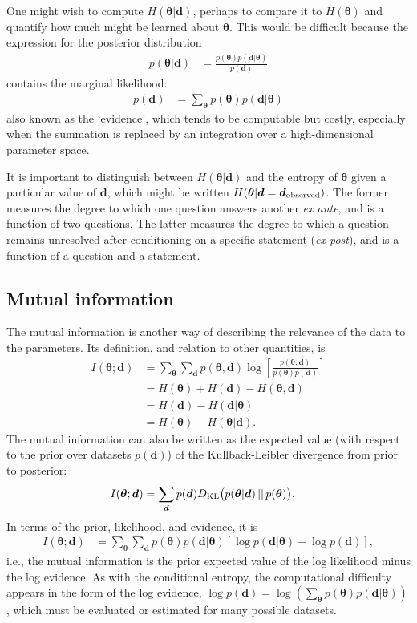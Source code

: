 \documentclass[entropy,article,accept,oneauthor,pdftex,10pt,a4paper]{mdpi}
\newcommand{\revision}{\color{darkblue}}
\renewcommand{\d}{\boldsymbol{d}}
\newcommand{\x}{\boldsymbol{\theta}}
\begin{document}
One might wish to compute $H(\x | \d)$, perhaps to compare it to
$H(\x)$ and quantify how much might be learned about $\x$.
This would be difficult because the expression
for the posterior distribution
\begin{align}
p(\x | \d) &= \frac{p(\x)p(\d | \x)}{p(\d)}
\end{align}
contains the marginal likelihood:
\begin{align}
p(\d) &= \sum_{\x} p(\x) p(\d | \x)
\end{align}
also known as the `evidence', which tends to be computable but costly,
especially when the summation is replaced by an integration over a
high-dimensional parameter space.

It is important to distinguish between $H(\x | \d)$ and the
entropy of $\x$ given a particular value of $\d$, which might be written
$H(\x | \d=\d_{\rm observed})$.
The former measures the degree to which one question answers
another {\em ex ante}, and is a function of two questions.
The latter measures the degree to which {\revision a question remains unresolved
after conditioning on a specific statement ({\em ex post})},
and is a function of a question and a statement.

\subsection{Mutual information}

The mutual information is another way of describing the relevance of the
data to the parameters. Its definition, and relation to other quantities, is
\begin{align}
I(\x; \d) &= \sum_{\x} \sum_{\d} p(\x, \d)
                       \log\left[\frac{p(\x, \d)}{p(\x)p(\d)}\right]\\
           &= H(\x) + H(\d) - H(\x, \d)\\
           &= H(\d) - H(\d | \x)\\
           &= H(\x) - H(\x | \d).
\end{align}
The mutual information can also be written as the expected value
(with respect to the prior over datasets $p(\d)$) of the Kullback-Leibler
divergence from prior to posterior:
\begin{align}
I(\x ; \d) &= \sum_{\d} p(\d) D_{\rm KL}\big(p(\x|\d) \, || \, p(\x)\big).
\end{align}
In terms of the prior, likelihood, and evidence,
it is
\begin{align}
I(\x; \d) &= \sum_{\x} \sum_{\d} p(\x)p(\d | \x)
              \left[\log p(\d | \x) - \log p(\d)\right],
\end{align}
i.e., the mutual information is the prior expected value of the
log likelihood minus the log evidence.
As with the conditional entropy, the computational
difficulty appears in the form of the log evidence,
$\log p(\d) = \log \left(\sum_{\x} p(\x)p(\d | \x)\right)$, which must be evaluated
or estimated for many possible datasets.
\end{document}
